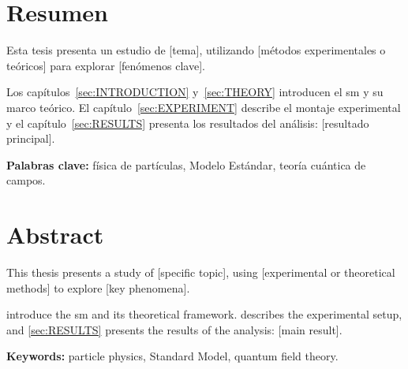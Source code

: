 \chapter*{Resumen}
\begin{otherlanguage}{spanish}\spanishsetup

Esta tesis presenta un estudio de [tema], utilizando [métodos experimentales o teóricos] para explorar [fenómenos clave].

Los capítulos~\ref{sec:INTRODUCTION} y~\ref{sec:THEORY} introducen el \gls{sm} y su marco teórico. El capítulo~\ref{sec:EXPERIMENT} describe el montaje experimental y el capítulo~\ref{sec:RESULTS} presenta los resultados del análisis: [resultado principal].

\vspace{1em}
\noindent\textbf{Palabras clave:} física de partículas, Modelo Estándar, teoría cuántica de campos.

\end{otherlanguage}
\cleardoublepage

\chapter*{Abstract}
%

This thesis presents a study of [specific topic], using [experimental or theoretical methods] to explore [key phenomena].

 introduce the \gls{sm} and its theoretical framework.  describes the experimental setup, and \cref{sec:RESULTS} presents the results of the analysis: [main result].

\vspace{1em}
\noindent\textbf{Keywords:} particle physics, Standard Model, quantum field theory.

\cleardoublepage
